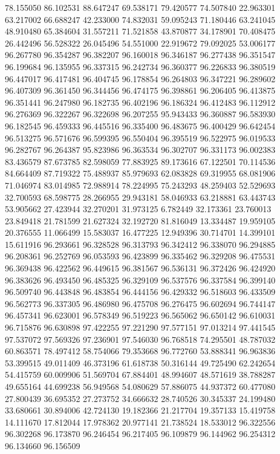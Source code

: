 78.155050
86.102531
88.647247
69.538171
79.420577
74.507840
22.963301
63.217002
66.688247
42.233000
74.832031
59.095243
71.180446
63.241045
48.910480
65.384604
31.557211
71.521858
43.870877
34.178901
70.408475
26.442496
56.528322
26.045496
54.551000
22.919672
79.092025
53.006177
96.267780
96.354287
96.382207
96.160018
96.346187
96.277438
96.351547
96.199684
96.135955
96.337315
96.242734
96.360377
96.226833
96.380519
96.447017
96.417481
96.404745
96.178854
96.264803
96.347221
96.289602
96.407309
96.361450
96.344456
96.474175
96.398861
96.206405
96.413875
96.351441
96.247980
96.182735
96.402196
96.186324
96.412483
96.112912
96.276369
96.322267
96.322698
96.207255
95.943433
96.360887
96.583930
96.182545
96.459333
96.445516
96.335400
96.483675
96.400429
96.642454
96.513275
96.571676
96.599395
96.550404
96.395519
96.522975
96.019533
96.282767
96.264387
95.823986
96.363534
96.302707
96.331173
96.002383
83.436579
87.673785
82.598059
77.883925
89.173616
67.122501
70.114536
84.664409
87.719322
75.488937
85.979693
62.083828
69.319955
68.081906
71.046974
83.014985
72.988914
78.224995
75.243293
48.259403
52.529693
32.700593
68.598775
28.266955
29.943181
58.046933
63.218881
63.443743
53.905662
27.423944
32.270201
31.973125
6.782449
32.173361
23.760013
23.849418
21.781599
21.627324
32.192720
81.816049
13.334487
19.959105
20.376555
11.066499
15.583037
16.477225
12.949396
30.714701
14.399101
15.611916
96.293661
96.328528
96.313793
96.342412
96.338070
96.294885
96.208361
96.252769
96.053593
96.423899
96.335462
96.329208
96.475531
96.369438
96.422562
96.449615
96.381567
96.536131
96.372426
96.424920
96.383626
96.493450
96.485325
96.329109
96.537576
96.337584
96.399140
96.509740
96.443848
96.483854
96.444156
96.429332
96.518603
96.433509
96.562773
96.337305
96.486980
96.475708
96.276475
96.602694
96.744147
96.457341
96.623001
96.578349
96.519223
96.565062
96.650142
96.610031
96.715876
96.630898
97.422255
97.221290
97.577151
97.013214
97.441545
97.537072
97.569326
97.236901
97.546030
96.768518
74.295501
48.787032
60.863571
78.497412
58.754066
79.353668
96.772760
53.888341
96.963836
53.399515
49.011409
46.373196
61.618738
50.316144
49.725490
62.242654
54.415759
60.009906
51.569704
67.884401
48.994607
48.571619
38.788287
49.655164
44.699238
56.949568
54.080629
57.886075
44.937372
60.477080
27.800439
36.695352
27.273752
34.666632
28.740526
30.345337
24.199480
33.680661
30.894006
42.724130
19.182366
21.217704
19.357133
15.419758
14.111670
17.812044
17.978362
20.977141
21.738524
18.533012
96.322556
96.302268
96.173870
96.246454
96.217405
96.109879
96.144962
96.254312
96.134660
96.156509
